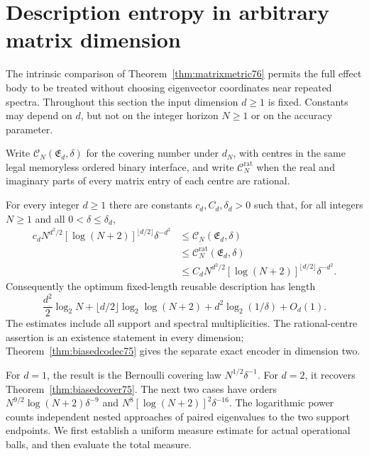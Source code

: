 \section{Description entropy in arbitrary matrix dimension}
\label{sec:matrixentropy76}
The intrinsic comparison of Theorem~\ref{thm:matrixmetric76} permits
the full effect body to be treated without choosing eigenvector
coordinates near repeated spectra. Throughout this section the input
dimension $d\ge1$ is fixed. Constants may depend on $d$, but not on the
integer horizon $N\ge1$ or on the accuracy parameter.

Write $\mathcal C_N(\mathfrak E_d,\delta)$ for the covering number under
$d_N$, with centres in the same legal memoryless ordered binary
interface, and write $\mathcal C_N^{\mathrm{rat}}$ when the real and
imaginary parts of every matrix entry of each centre are rational.

\begin{theorem}\label{thm:matrixcover76}
For every integer $d\ge1$ there are constants $c_d,C_d,\delta_d>0$
such that, for all integers $N\ge1$ and all $0<\delta\le\delta_d$,
\begin{equation}\label{eq:matrixcover76}
\begin{split}
 c_d N^{d^2/2}[\log(N+2)]^{\lfloor d/2\rfloor}\delta^{-d^2}
 &\le \mathcal C_N(\mathfrak E_d,\delta)\\
 &\le \mathcal C_N^{\mathrm{rat}}(\mathfrak E_d,\delta)\\
 &\le C_d N^{d^2/2}[\log(N+2)]^{\lfloor d/2\rfloor}\delta^{-d^2}.
\end{split}
\end{equation}
Consequently the optimum fixed-length reusable description has length
\begin{equation}\label{eq:matrixbits76}
 \frac{d^2}{2}\log_2N
 +\lfloor d/2\rfloor\log_2\log(N+2)
 +d^2\log_2(1/\delta)+O_d(1).
\end{equation}
The estimates include all support and spectral multiplicities. The
rational-centre assertion is an existence statement in every dimension;
Theorem~\ref{thm:biasedcodec75} gives the separate exact encoder in
dimension two.
\end{theorem}

For $d=1$, the result is the Bernoulli covering law
$N^{1/2}\delta^{-1}$. For $d=2$, it recovers
Theorem~\ref{thm:biasedcover75}. The next two cases have orders
$N^{9/2}\log(N+2)\delta^{-9}$ and
$N^8[\log(N+2)]^2\delta^{-16}$. The logarithmic power counts independent
nested approaches of paired eigenvalues to the two support endpoints.
We first establish a uniform measure estimate for actual operational
balls, and then evaluate the total measure.

